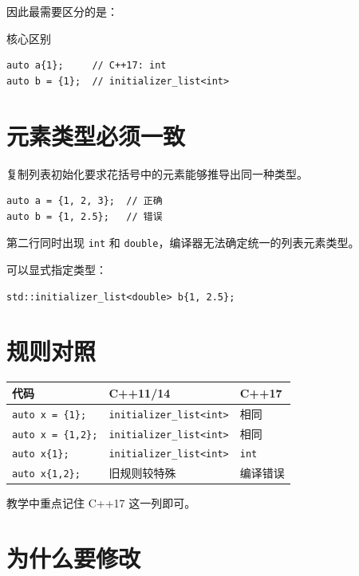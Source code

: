 \documentclass[UTF8,12pt,a4paper]{ctexart}
\begin{document}
因此最需要区分的是：

\begin{conceptbox}{核心区别}
\begin{lstlisting}
auto a{1};     // C++17: int
auto b = {1};  // initializer_list<int>
\end{lstlisting}
\end{conceptbox}

\section{元素类型必须一致}

复制列表初始化要求花括号中的元素能够推导出同一种类型。

\begin{lstlisting}
auto a = {1, 2, 3};  // 正确
auto b = {1, 2.5};   // 错误
\end{lstlisting}

第二行同时出现 \texttt{int} 和 \texttt{double}，编译器无法确定统一的列表元素类型。

可以显式指定类型：

\begin{lstlisting}
std::initializer_list<double> b{1, 2.5};
\end{lstlisting}

\section{规则对照}

\begin{center}
\begin{tabular}{lll}
\toprule
代码 & C++11/14 & C++17 \\
\midrule
\texttt{auto x = \{1\};} & \texttt{initializer\_list<int>} & 相同 \\
\texttt{auto x = \{1,2\};} & \texttt{initializer\_list<int>} & 相同 \\
\texttt{auto x\{1\};} & \texttt{initializer\_list<int>} & \texttt{int} \\
\texttt{auto x\{1,2\};} & 旧规则较特殊 & 编译错误 \\
\bottomrule
\end{tabular}
\end{center}

教学中重点记住 C++17 这一列即可。

\section{为什么要修改}
\end{document}
